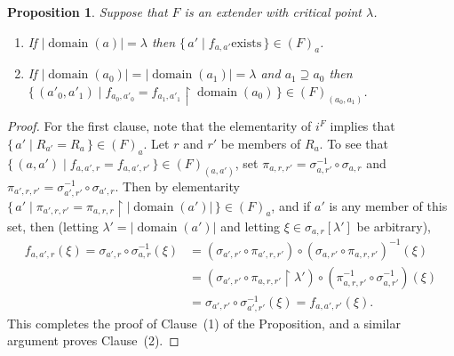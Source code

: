 \documentclass[
twoside,
]{article}
\newtheorem{proposition}[theorem]{Proposition}
\theoremstyle{definition}
\theoremstyle{remark}
\newcommand{\ufFromExt}[2]{(#1)_{#2}}
\newcommand{\set}[1]{\{\,#1\,\}}
\newcommand{\card}[1]{|#1|}
\newcommand{\restrict}{{\upharpoonright}}
\DeclareMathOperator{\domain}{domain}
\begin{document}
  \begin{proposition}\label{thm:faa_exists}
    Suppose that $F$ is an extender with critical point $\lambda$.
    \begin{enumerate}
    \item
      If 
      $\card{\domain(a)}=\lambda$ then $\set{a'\mid f_{a,a'}\text{
          exists}}\in \ufFromExt{F}{a}$.
    \item If $\card{\domain(a_0)}=\card{\domain(a_1)}=\lambda$ and
      $a_1\supseteq a_0$ then $\set{(a'_0,a'_1)\mid
        f_{a_0,a'_0}=f_{a_1,a'_1}\restrict\domain(a_0)}\in \ufFromExt{F}{(a_0,a_1)}$.
    \end{enumerate}
  \end{proposition}
  \begin{proof}
    For the first clause, note that the elementarity of $i^{F}$
    implies that $\set{a'\mid R_{a'}=R_a}\in \ufFromExt{F}{a}$.  Let
    $r$ and $r'$ be members of $R_a$.  To see that  $\set{(a,a')\mid
      f_{a,a',r}=f_{a,a',r'}}\in\ufFromExt{F}{(a,a')}$, set 
    $\pi_{a,r,r'}=\sigma^{-1}_{a,r'}\circ\sigma_{a,r}$
    and
    $\pi_{a',r,r'}=\sigma^{-1}_{a',r'}\circ\sigma_{a',r}$.  
    Then by elementarity $\set{a'\mid \pi_{a',r,r'}=\pi_{a,r,r}\restrict\card{\domain(a')}}\in
    \ufFromExt{F}{a}$, and if  $a'$ is any member of this set, then (letting
    $\lambda'=\card{\domain(a')}$ and  letting 
    $\xi\in\sigma_{a,r}[\lambda']$ be arbitrary),  
    \begin{align*}
      f_{a,a',r}(\xi)=\sigma_{a',r}\circ\sigma_{a,r}^{-1}(\xi)&=(\sigma_{a',r'}\circ\pi_{a',r,r'})\circ
                                                (\sigma_{a,r'}\circ\pi_{a,r,r'})^{-1}(\xi)\\
      &=(\sigma_{a',r'}\circ\pi_{a,r,r'}\restrict\lambda')\circ
                                                (\pi^{-1}_{a,r,r'}\circ
                                \sigma^{-1}_{a,r'})(\xi)\\
      &=\sigma_{a',r'}\circ\sigma^{-1}_{a',r'}(\xi)=f_{a,a',r'}(\xi).
    \end{align*}
    This completes the proof of Clause~(1) of the Proposition, and a similar
    argument proves Clause~(2).
  \end{proof}
\end{document}
